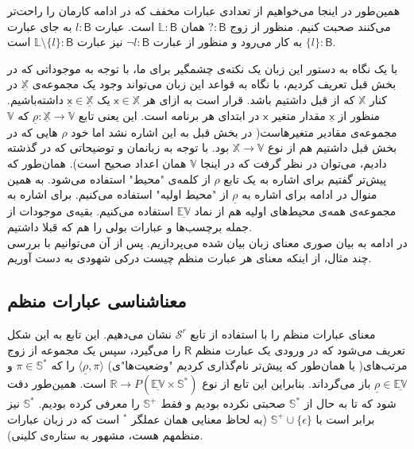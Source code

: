 همین‌طور در اینجا می‌خواهیم از تعدادی عبارات مخفف که در ادامه کارمان را راحت‌تر می‌کنند صحبت کنیم. منظور از زوج 
$\mathsf{? : B}$
همان 
$\mathbb{L}\mathsf{ : B}$
است. عبارت 
$l : \mathsf{B}$
به جای عبارت 
$\{l\} : \mathsf{B}$
به کار می‌رود و منظور از عبارت 
$\neg l \mathsf{: B}$
نیز عبارت 
$\mathbb{L}\setminus\{l\}:\mathsf{B}$
است.

با یک نگاه به دستور این زبان یک نکته‌ی چشمگیر برای ما، با توجه به موجوداتی که در بخش قبل تعریف کردیم، با نگاه به قواعد این زبان می‌تواند وجود یک مجموعه‌ی
$\mathbb{\underline{X}}$
در کنار 
$\mathbb{X}$
که از قبل داشتیم باشد. قرار است به ازای هر 
$\mathsf{x}\in\mathbb{X}$
یک 
$\mathsf{\underline{x}}\in\mathbb{\underline{X}}$
داشته‌باشیم. منظور از 
$\mathsf{\underline{x}}$
مقدار متغیر 
$\mathsf{x}$
در ابتدای هر برنامه است. این یعنی تابع
$\underline{\rho}: \mathbb{\underline{X}} \rightarrow \mathbb{V}$
که 
$\mathbb{V}$
مجموعه‌ی مقادیر متغیرهاست( در بخش قبل به این اشاره نشد اما خود
$\rho$
هایی که در بخش قبل داشتیم هم از نوع
$\mathbb{X} \rightarrow \mathbb{V}$
بود. با توجه به زبانمان و توضیحاتی که در گذشته دادیم، می‌توان در نظر گرفت که در اینجا 
$\mathbb{V}$
همان اعداد صحیح است). همان‌طور که پیش‌تر گفتیم برای اشاره به یک تابع
$\rho$
از کلمه‌ی "محیط" استفاده می‌شود. به همین منوال در ادامه برای اشاره‌ به 
$\underline{\rho}$
از "محیط اولیه" استفاده می‌کنیم. برای اشاره به مجموعه‌ی همه‌ی محیط‌های اولیه هم از نماد 
$\underline{\mathbb{EV}}$
استفاده می‌کنیم.
بقیه‌ی موجودات از جمله برچسب‌ها و عبارات بولی را هم که قبلا داشتیم.\\
در ادامه به بیان صوری معنای زبان بیان شده می‌پردازیم. پس از آن می‌توانیم با بررسی چند مثال، از اینکه معنای هر عبارت منظم چیست درکی شهودی به دست آوریم.\\

\subsection{معناشناسی عبارات منظم}
معنای عبارات منظم را با استفاده از تابع 
$\mathcal{S}^r$
نشان می‌دهیم. این تابع به این شکل تعریف می‌شود که در ورودی یک عبارت منظم 
$\mathsf{R}$
را می‌گیرد، سپس یک مجموعه از زوج مرتب‌های( یا همان‌طور که پیش‌تر نام‌گذاری کردیم "وضعیت‌ها"ی)
$\langle\underline{\rho} , \pi\rangle$
را که 
$\pi \in \mathbb{S^*}$
و 
$\underline{\rho} \in \underline{\mathbb{EV}}$
باز می‌گرداند. بنابراین این تابع از نوع
$\mathbb{R} \rightarrow \mathit{P} (\mathbb{\underline{EV} \times S^*})$
است. همین‌طور دقت شود که تا به حال از 
$\mathbb{S}^*$
صحبتی نکرده بودیم و فقط 
$\mathbb{S}^+$
را معرفی کرده بودیم. 
$\mathbb{S}^*$
نیز برابر است با
$\mathbb{S}^+ \cup \{\epsilon\}$ 
(به لحاظ معنایی همان عملگر
$^*$
است که در زبان عبارات منظمهم هست، مشهور به ستاره‌ی کلینی).

